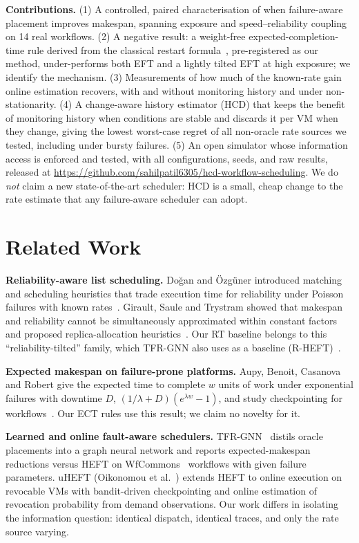 \documentclass[conference]{IEEEtran}
\newcommand{\ECT}{\textsf{ECT}}
\newcommand{\RT}{\textsf{RT}}
\begin{document}
\textbf{Contributions.}
(1) A controlled, paired characterisation of when failure-aware placement improves makespan,
spanning exposure and speed--reliability coupling on 14 real workflows.
(2) A negative result: a weight-free expected-completion-time rule derived from the classical
restart formula~\cite{aupy2016checkpointing}, pre-registered as our method, under-performs both
EFT and a lightly tilted EFT at high exposure; we identify the mechanism.
(3) Measurements of how much of the known-rate gain online estimation recovers, with and without
monitoring history and under non-stationarity.
(4) A change-aware history estimator (\textsf{HCD}) that keeps the benefit of monitoring history when
conditions are stable and discards it per VM when they change, giving the lowest worst-case regret of
all non-oracle rate sources we tested, including under bursty failures.
(5) An open simulator whose information access is enforced and tested, with all
configurations, seeds, and raw results, released at
\url{https://github.com/sahilpatil6305/hcd-workflow-scheduling}.
We do \emph{not} claim a new state-of-the-art scheduler: \textsf{HCD} is a small, cheap change to the rate
estimate that any failure-aware scheduler can adopt.

\section{Related Work}
\textbf{Reliability-aware list scheduling.} Doğan and Özgüner introduced matching and
scheduling heuristics that trade execution time for reliability under Poisson failures with
known rates~\cite{dogan2001trading,dogan2005biobjective}. Girault, Saule and Trystram showed
that makespan and reliability cannot be simultaneously approximated within constant factors
and proposed replica-allocation heuristics~\cite{girault2008reliability}. Our \RT{} baseline belongs to
this ``reliability-tilted'' family, which TFR-GNN also uses as a baseline
(R-HEFT)~\cite{yang2026tfrgnn}.

\textbf{Expected makespan on failure-prone platforms.} Aupy, Benoit, Casanova and Robert give
the expected time to complete $w$ units of work under exponential failures with downtime $D$,
$(1/\lambda + D)(e^{\lambda w}-1)$, and study checkpointing for workflows~\cite{aupy2016checkpointing}.
Our \ECT{} rules use this result; we claim no novelty for it.

\textbf{Learned and online fault-aware schedulers.} TFR-GNN~\cite{yang2026tfrgnn} distils oracle
placements into a graph neural network and reports expected-makespan reductions versus HEFT on
WfCommons~\cite{coleman2022wfcommons} workflows with given failure parameters. uHEFT
(Oikonomou et al.~\cite{oikonomou2025proactive}) extends HEFT to online execution on revocable VMs
with bandit-driven checkpointing and online estimation of revocation probability from demand
observations. Our work differs in isolating the information question: identical dispatch,
identical traces, and only the rate source varying.
\end{document}
